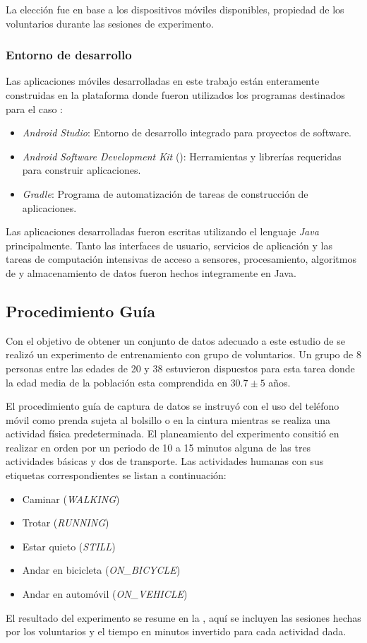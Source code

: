La elección fue en base a los dispositivos móviles disponibles, propiedad
de los voluntarios durante las sesiones de experimento.

\subsubsection{Entorno de desarrollo }

Las aplicaciones móviles desarrolladas en este trabajo están enteramente
construidas en la plataforma \emph{} donde fueron utilizados
los programas destinados para el caso \cite{Android2016}:
\begin{itemize}
\item \emph{Android Studio}: Entorno de desarrollo integrado para proyectos\emph{
}de software.
\item \emph{Android} \emph{Software Development Kit }(): Herramientas
y librerías  requeridas para construir aplicaciones.
\item \emph{Gradle}: Programa de automatización de tareas de construcción
de aplicaciones.
\end{itemize}
Las aplicaciones desarrolladas fueron escritas utilizando el lenguaje
\emph{Java }principalmente. Tanto las interfaces de usuario, servicios
de aplicación y las tareas de computación intensivas de acceso a sensores,
procesamiento, algoritmos de  y almacenamiento de datos
fueron hechos integramente en Java.

\subsection{Procedimiento Guía }

Con el objetivo de obtener un conjunto de datos adecuado a este estudio
de  se realizó un experimento de entrenamiento con grupo
de voluntarios. Un grupo de 8 personas entre las edades de 20 y 38
estuvieron dispuestos para esta tarea donde la edad media de la población
esta comprendida en $30.7\pm5$ años. 

El procedimiento guía de captura de datos se instruyó con el uso del
teléfono móvil como prenda sujeta al bolsillo o en la cintura mientras
se realiza una actividad física predeterminada. El planeamiento del
experimento consitió en realizar en orden por un periodo de 10 a 15
minutos alguna de las tres actividades básicas y dos de transporte.
Las actividades humanas con sus etiquetas correspondientes se listan
a continuación:
\begin{itemize}
\item Caminar (\emph{WALKING})
\item Trotar (\emph{RUNNING})
\item Estar quieto (\emph{STILL})
\item Andar en bicicleta (\emph{ON\_BICYCLE})
\item Andar en automóvil (\emph{ON\_VEHICLE})
\end{itemize}
El resultado del experimento se resume en la ,
aquí se incluyen las sesiones hechas por los voluntarios y el tiempo
en minutos invertido para cada actividad dada. 

